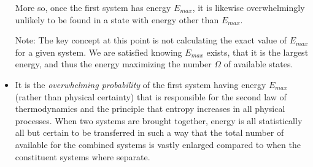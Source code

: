 \documentclass[11pt, a4paper]{article}
\begin{document}
\begin{itemize}
	More so, once the first system has energy $ E_{max} $, it is likewise overwhelmingly unlikely to be found in a state with energy other than $ E_{max} $.
	
	Note: The key concept at this point is not calculating the exact value of $ E_{max} $ for a given system. We are satisfied knowing $ E_{max} $ exists, that it is the largest energy, and thus the energy maximizing the number $ \Omega $ of available states.
	
	\item It is the \textit{overwhelming probability} of the first system having energy $ E_{max} $ (rather than physical certainty) that is responsible for the second law of thermodynamics and the principle that entropy increases in all physical processes. When two systems are brought together, energy is all statistically all but certain to be transferred in such a way that the total number of available for the combined systems is vastly enlarged compared to when the constituent systems where separate.
	
\end{itemize}
\end{document}
